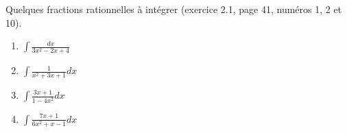 \begin{exercice}\label{exoGeneral0018}

Quelques fractions rationnelles à intégrer (exercice 2.1, page 41, numéros 1, 2 et 10). 
\begin{enumerate}

\item
$\int \frac{ dx }{ 3x^2-2x+4 }$
\item
$\int \frac{ 1 }{ x^2+3x+1 } dx$
\item
$\int \frac{ 3x+1 }{ 1-4x^2 } dx$
\item
$\int \frac{ 7x+1 }{ 6x^2+x-1 } dx$

\end{enumerate}


\end{exercice}
